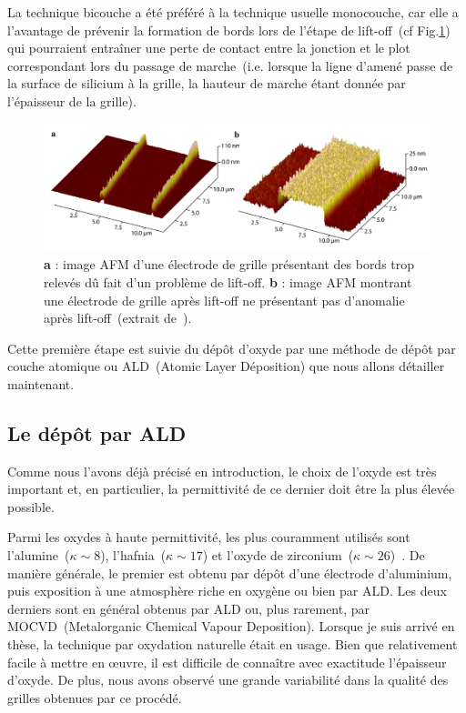 La technique bicouche a été préféré à la technique usuelle monocouche, car elle a l'avantage de prévenir la formation de bords lors de l'étape de lift-off~(cf Fig.\ref{lift-off}) qui pourraient entraîner une perte de contact entre la jonction et le plot correspondant lors du passage de marche~(i.e. lorsque la ligne d'amené passe de la surface de silicium à la grille, la hauteur de marche étant donnée par l'épaisseur de la grille).


\begin{figure}
\centering \includegraphics[scale=0.45]{Fabrication/BatmanGrille/BatmanGrille.pdf}
\caption{\textbf{a} : image AFM d'une électrode de grille présentant des bords trop relevés d\^u fait d'un problème de lift-off. \textbf{b} : image AFM montrant une électrode de grille après lift-off ne présentant pas d'anomalie après lift-off~(extrait de~\cite{RochPhD}).}
\label{lift-off}
\end{figure}

Cette première étape est suivie du dépôt d'oxyde par une méthode de dépôt par couche atomique ou ALD~(Atomic Layer Déposition) que nous allons détailler maintenant.

\subsection{Le dép\^ot par ALD}

Comme nous l'avons déjà précisé en introduction, le choix de l'oxyde est très important et, en particulier, la permittivité de ce dernier doit être la plus élevée possible.

Parmi les oxydes à haute permittivité, les plus couramment utilisés sont l'alumine~($\kappa \sim 8$), l'hafnia~($\kappa \sim 17$) et l'oxyde de zirconium~($\kappa \sim 26$)~\cite{Biercuk2003}. De manière générale, le premier est obtenu par dépôt d'une électrode d'aluminium, puis exposition à une atmosphère riche en oxygène ou bien par ALD. Les deux derniers sont en général obtenus par ALD ou, plus rarement, par MOCVD~(Metalorganic Chemical Vapour Deposition). Lorsque je suis arrivé en thèse, la technique par oxydation naturelle était en usage. Bien que relativement facile à mettre en œuvre, il est difficile de connaître avec exactitude l'épaisseur d'oxyde. De plus, nous avons observé une grande variabilité dans la qualité des grilles obtenues par ce procédé.

